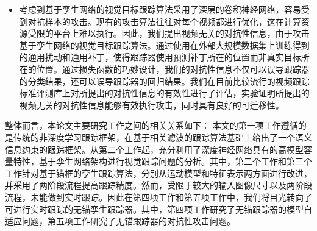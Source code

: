 \begin{itemize}
\item 考虑到基于孪生网络的视觉目标跟踪算法采用了深层的卷积神经网络，容易受到对抗样本的攻击。现有的攻击算法往往对每个视频都进行优化，这在计算资源受限的平台上难以执行。因此，我们提出视频无关的对抗性信息，由于攻击基于孪生网络的视觉目标跟踪算法。通过使用在外部大规模数据集上训练得到的通用扰动和通用补丁，使得跟踪器使用预测补丁所在的位置而非真实目标所在的位置。通过损失函数的巧妙设计，我们的对抗性信息不仅可以误导跟踪器的分类结果，还可以误导跟踪器的回归结果。我们在目前比较流行的视频跟踪标准评测库上对所提出的对抗性信息的有效性进行了评估，实验证明所提出的视频无关的对抗性信息能够有效执行攻击，同时具有良好的可迁移性。
\end{itemize}

整体而言，本论文主要研究工作之间的相关关系如下：
本文的第一项工作遵循的是传统的非深度学习跟踪框架，在基于相关滤波的跟踪算法基础上给出了一个语义信息约束的跟踪框架。从第二个工作起，充分利用了深度神经网络具有的高模型容量特性，基于孪生网络架构进行视觉跟踪问题的分析。其中，第二个工作和第三个工作针对基于锚框的孪生跟踪算法，分别从运动模型和特征表示两方面进行改进，并采用了两阶段流程提高跟踪精度。然而，受限于较大的输入图像尺寸以及两阶段流程，未能做到实时跟踪。因此在第四项工作和第五项工作中，我们将目光转向了可进行实时跟踪的无锚孪生跟踪器。其中，第四项工作研究了无锚跟踪器的模型自适应问题，第五项工作研究了无锚跟踪器的对抗性攻击问题。

